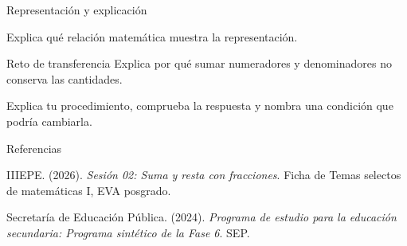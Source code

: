 \documentclass[
	spanish,
	aspectratio=1610,
	xcolor={dvipsnames,table}
]{beamer}
\begin{document}
\begin{frame}{Representación y explicación}
\centering{}\par\vspace{.15cm}\small Explica qué relación matemática muestra la representación.
\end{frame}
\begin{frame}{Reto de transferencia}
\fontsize{14}{18}\selectfont Explica por qué sumar numeradores y denominadores no conserva las cantidades.\par\vspace{.5cm}Explica tu procedimiento, comprueba la respuesta y nombra una condición que podría cambiarla.
\end{frame}
\begin{frame}{Referencias}
\fontsize{9}{11}\selectfont\raggedright 
{\setlength{\parskip}{6pt}
\par\hangindent=1.27cm  IIIEPE. (2026). \textit{Sesión 02: Suma y resta con fracciones}. Ficha de Temas selectos de matemáticas I, EVA posgrado.
\par\hangindent=1.27cm  Secretaría de Educación Pública. (2024). \textit{Programa de estudio para la educación secundaria: Programa sintético de la Fase 6}. SEP.
}


\end{frame}
\end{document}

